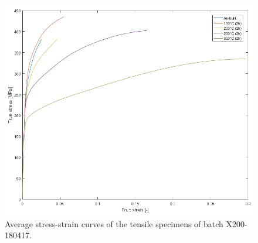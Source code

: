 \begin{figure}[ht]
\centering
\centerline{\includegraphics[scale=0.6]{Images/MeanTrac}}
\decoRule
\caption[Average stress-strain curves of the tensile specimens of batch X200-180417.]{Average stress-strain curves of the tensile specimens of batch X200-180417.}
\label{fig:MeanTrac}
\end{figure}

